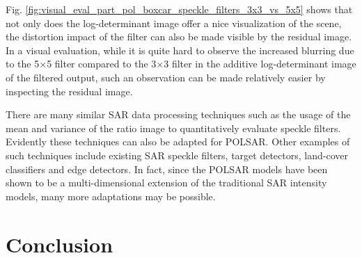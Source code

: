 \documentclass[journal]{IEEEtran}
\begin{document}
Fig. \ref{fig:visual_eval_part_pol_boxcar_speckle_filters_3x3_vs_5x5} shows that not only does the log-determinant image offer a nice visualization of the scene, 
  the distortion impact of the filter can also be made visible by the residual image.
In a visual evaluation, while it is quite hard to observe the increased blurring due to the 5$\times$5 filter compared to the 3$\times$3 filter
in the additive log-determinant image of the filtered output, 
  such an observation can be made relatively easier by inspecting the residual image.

There are many similar SAR data processing techniques such as  the usage of  the mean and variance of the ratio image to quantitatively evaluate speckle filters.
Evidently these techniques can also be adapted for POLSAR.
Other examples of such techniques include existing SAR speckle filters, target detectors, land-cover classifiers and edge detectors.
In fact, since the POLSAR models have been shown to be a multi-dimensional extension of the traditional SAR intensity models,
many more adaptations may be possible.




  
\section{Conclusion}
\label{sec:conclusion}
\end{document}

